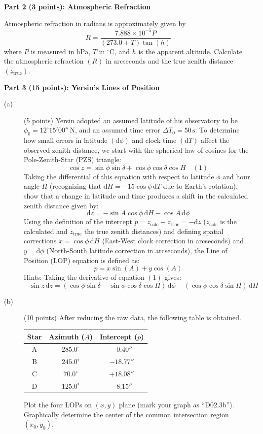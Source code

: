 \medskip\noindent\textbf{Part 2 (3 points): Atmospheric Refraction}

Atmospheric refraction in radians is approximately given by
\[
R = \frac{7.888 \times 10^{-5} P}{(273.0 + T)\tan(h)}
\]
where $P$ is measured in $\mathrm{hPa}$, $T$ in $^\circ\mathrm{C}$, and $h$ is
the apparent altitude. Calculate the atmospheric refraction $(R)$ in
arcseconds and the true zenith distance $(z_{\mathrm{true}})$.

\medskip\noindent\textbf{Part 3 (15 points): Yersin's Lines of Position}

\begin{description}
\item[(a)] (5 points) Yersin adopted an assumed latitude of his observatory to
  be $\phi_0 = 12^\circ 15' 00''\,\mathrm{N}$, and an assumed time error
  $\Delta T_0 = 50\,\mathrm{s}$. To determine how small errors in latitude
  $(\mathrm{d}\phi)$ and clock time $(\mathrm{d}T)$ affect the observed zenith
  distance, we start with the spherical law of cosines for the
  Pole-Zenith-Star (PZS) triangle:
  \[
  \cos z = \sin\phi \sin\delta + \cos\phi \cos\delta \cos H \quad (1)
  \]
  Taking the differential of this equation with respect to latitude $\phi$ and
  hour angle $H$ (recognizing that $\mathrm{d}H = -15\cos\phi\,\mathrm{d}T$
  due to Earth's rotation), show that a change in latitude and time produces a
  shift in the calculated zenith distance given by:
  \[
  \mathrm{d}z = -\sin A \cos\phi\,\mathrm{d}H - \cos A\,\mathrm{d}\phi
  \]
  Using the definition of the intercept
  $p = z_{\mathrm{calc}} - z_{\mathrm{true}} = -\mathrm{d}z$
  ($z_{\mathrm{calc}}$ is the calculated and $z_{\mathrm{true}}$ the true
  zenith distances) and defining spatial corrections
  $x = \cos\phi\,\mathrm{d}H$ (East-West clock correction in arcseconds) and
  $y = \mathrm{d}\phi$ (North-South latitude correction in arcseconds), the
  Line of Position (LOP) equation is defined as:
  \[
  p = x\sin(A) + y\cos(A)
  \]
  Hints: Taking the derivative of equation $(1)$ gives:
  \[
  -\sin z\,\mathrm{d}z
  = (\cos\phi \sin\delta - \sin\phi \cos\delta \cos H)\,\mathrm{d}\phi
    - (\cos\phi \cos\delta \sin H)\,\mathrm{d}H
  \]
\item[(b)] (10 points) After reducing the raw data, the following table is
  obtained.

  \begin{center}
  \begin{tabular}{ccc}
  \toprule
  Star & Azimuth ($A$) & Intercept ($p$) \\
  \midrule
  A & $285.0^\circ$ & $-0.40''$ \\
  B & $245.0^\circ$ & $-18.77''$ \\
  C & $70.0^\circ$ & $+18.08''$ \\
  D & $125.0^\circ$ & $-8.15''$ \\
  \bottomrule
  \end{tabular}
  \end{center}

  Plot the four LOPs on $(x, y)$ plane (mark your graph as ``D02.3b'').
  Graphically determine the center of the common intersection region
  $(x_0, y_0)$.
\end{description}

